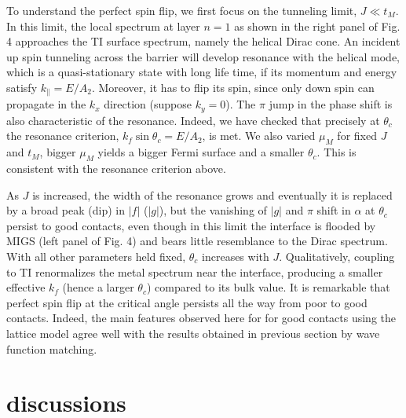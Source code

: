 \documentclass[11pt]{report}
\begin{document}
To understand the perfect spin flip, we first focus on 
the tunneling limit, $J\ll t_M$. In this limit, the local spectrum at layer $n=1$ as shown
in the right panel of Fig. 4 approaches
the TI surface spectrum, namely the helical Dirac cone. An incident up spin 
tunneling across the barrier will develop resonance with the helical mode, which is
a quasi-stationary state with long life time, if its 
momentum and energy satisfy $k_\parallel=E/A_2$. Moreover, it has to flip its spin, since 
only down spin can propagate in the $k_x$ direction (suppose $k_y=0$). 
The $\pi$ jump in the phase shift is also characteristic of the resonance. Indeed,
we have checked that precisely at $\theta_c$ the resonance criterion, $k_f\sin\theta_c=E/A_2$, 
is met.
We also varied $\mu_M$ for fixed $J$ and $t_M$, bigger $\mu_M$ 
yields a bigger Fermi surface and a smaller $\theta_c$. This is consistent with 
the resonance criterion above.

As $J$ is increased, the width of the resonance grows and eventually it is replaced by a 
broad peak (dip) in $|f|$ ($|g|$), but the vanishing of $|g|$ and $\pi$
shift in $\alpha$ at $\theta_c$ persist to good contacts,
even though in this limit the interface is flooded by MIGS (left panel of Fig. 4) 
and bears little resemblance to the Dirac spectrum.
With all other parameters held fixed, $\theta_c$ increases with $J$. Qualitatively,
coupling to TI renormalizes the metal spectrum near the interface, producing a smaller effective $k_f$ (hence a larger $\theta_c$) compared to its bulk value. 
It is remarkable that perfect spin flip at the critical angle persists all
the way from poor to good contacts. Indeed, the main features observed here for
for good contacts using the lattice model 
agree well with the results obtained in previous section by wave function matching. 

\section{discussions}
\end{document}
